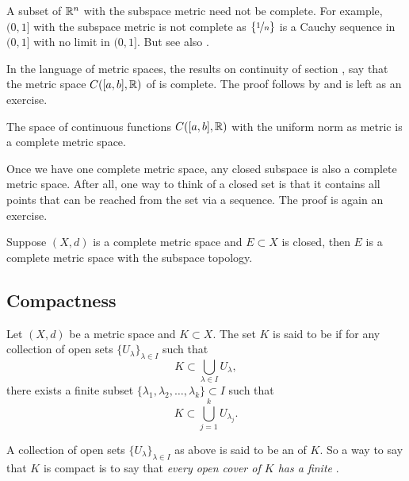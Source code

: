 A subset of ${\mathbb{R}}^n$ with the subspace metric need not be
complete.  For example, $(0,1]$ with the subspace metric is not
complete as $\{ \nicefrac{1}{n} \}$ is a Cauchy sequence in $(0,1]$
with no limit in $(0,1]$.  But see also
.

In the language of metric spaces,
the results on continuity of section ,
say that the metric space
$C([a,b],{\mathbb{R}})$ of  is complete.
The proof follows by  
and is left as an exercise.

\begin{prop} \label{prop:CabRcomplete}
The space of continuous functions $C([a,b],{\mathbb{R}})$ with the uniform
norm as metric is a complete metric space.
\end{prop}

Once we have one complete metric space, any closed subspace is
also a complete metric space.  After all, one way
to think of a closed set is that it contains all points
that can be reached from the set via a sequence.
The proof is again an exercise.

\begin{prop} \label{prop:closedcomplete}
Suppose $(X,d)$ is a complete metric space and $E \subset X$
is closed, then $E$ is a complete metric space with the subspace topology.
\end{prop}

\subsection{Compactness}

\begin{defn}
Let $(X,d)$ be a metric space and $K \subset X$. 
The set $K$ is said to be \emph{}
if for any collection
of open sets $\{ U_{\lambda} \}_{\lambda \in I}$ such that
\begin{equation*}
K \subset \bigcup_{\lambda \in I} U_\lambda ,
\end{equation*}
there exists a finite subset
$\{ \lambda_1, \lambda_2,\ldots,\lambda_k \} \subset I$
such that
\begin{equation*}
K \subset \bigcup_{j=1}^k U_{\lambda_j} .
\end{equation*}
\end{defn}

A collection of open sets $\{ U_{\lambda} \}_{\lambda \in I}$ as above is
said to be an \emph{} of $K$.  So a way to say that
$K$ is compact is to say that \emph{every open cover of $K$ has a finite
}.

